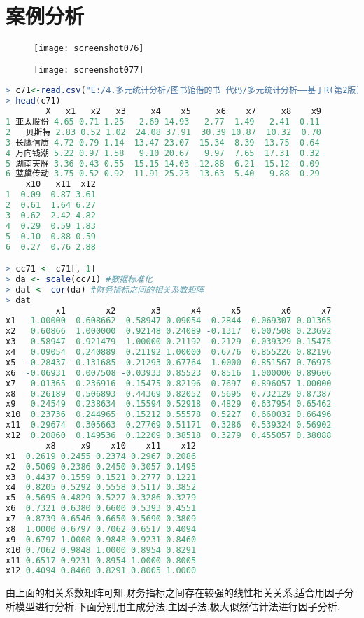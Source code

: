 \documentclass[11pt,a4paper,oneside]{book}
\begin{document}
\section{案例分析}
\begin{figure}[H]
	\centering
	\texttt{[image: screenshot076]}
\end{figure}
\begin{figure}[H]
	\centering
	\texttt{[image: screenshot077]}
\end{figure}

\begin{lstlisting}[language=r]
> c71<-read.csv("E:/4.多元统计分析/图书馆借的书 代码/多元统计分析——基于R(第2版) R-data/case7.1.csv")
> head(c71)
        X   x1   x2   x3     x4    x5     x6    x7     x8    x9
1 亚太股份 4.65 0.71 1.25   2.69 14.93   2.77  1.49   2.41  0.11
2   贝斯特 2.83 0.52 1.02  24.08 37.91  30.39 10.87  10.32  0.70
3 长鹰信质 4.72 0.79 1.14  13.47 23.07  15.34  8.39  13.75  0.64
4 万向钱潮 5.22 0.97 1.58   9.10 20.67   9.97  7.65  17.31  0.32
5 湖南天雁 3.36 0.43 0.55 -15.15 14.03 -12.88 -6.21 -15.12 -0.09
6 蓝黛传动 3.75 0.52 0.92  11.91 25.23  13.63  5.40   9.88  0.29
    x10   x11  x12
1  0.09  0.87 3.61
2  0.61  1.64 6.27
3  0.62  2.42 4.82
4  0.29  0.59 1.83
5 -0.10 -0.88 0.59
6  0.27  0.76 2.88

> cc71 <- c71[,-1]
> da <- scale(cc71) #数据标准化
> dat <- cor(da) #财务指标之间的相关系数矩阵
> dat
          x1        x2       x3      x4      x5        x6      x7
x1   1.00000  0.608662  0.58947 0.09054 -0.2844 -0.069307 0.01365
x2   0.60866  1.000000  0.92148 0.24089 -0.1317  0.007508 0.23692
x3   0.58947  0.921479  1.00000 0.21192 -0.2129 -0.039329 0.15475
x4   0.09054  0.240889  0.21192 1.00000  0.6776  0.855226 0.82196
x5  -0.28437 -0.131685 -0.21293 0.67764  1.0000  0.851567 0.76975
x6  -0.06931  0.007508 -0.03933 0.85523  0.8516  1.000000 0.89606
x7   0.01365  0.236916  0.15475 0.82196  0.7697  0.896057 1.00000
x8   0.26189  0.506893  0.44369 0.82052  0.5695  0.732129 0.87387
x9   0.24549  0.238634  0.15594 0.52918  0.4829  0.637954 0.65462
x10  0.23736  0.244965  0.15212 0.55578  0.5227  0.660032 0.66496
x11  0.29674  0.305663  0.27769 0.51171  0.3286  0.539324 0.56902
x12  0.20860  0.149536  0.12209 0.38518  0.3279  0.455057 0.38088
        x8     x9    x10    x11    x12
x1  0.2619 0.2455 0.2374 0.2967 0.2086
x2  0.5069 0.2386 0.2450 0.3057 0.1495
x3  0.4437 0.1559 0.1521 0.2777 0.1221
x4  0.8205 0.5292 0.5558 0.5117 0.3852
x5  0.5695 0.4829 0.5227 0.3286 0.3279
x6  0.7321 0.6380 0.6600 0.5393 0.4551
x7  0.8739 0.6546 0.6650 0.5690 0.3809
x8  1.0000 0.6797 0.7062 0.6517 0.4094
x9  0.6797 1.0000 0.9848 0.9231 0.8460
x10 0.7062 0.9848 1.0000 0.8954 0.8291
x11 0.6517 0.9231 0.8954 1.0000 0.8005
x12 0.4094 0.8460 0.8291 0.8005 1.0000
\end{lstlisting}
由上面的相关系数矩阵可知,财务指标之间存在较强的线性相关关系,适合用因子分析模型进行分析.下面分别用主成分法,主因子法,极大似然估计法进行因子分析.
\end{document}
